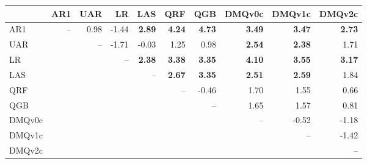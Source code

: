 \begin{tabular}{lrrrrrrrrr}
\toprule
 & AR1 & UAR & LR & LAS & QRF & QGB & DMQv0c & DMQv1c & DMQv2c \\
\midrule
AR1 & -- & 0.98 & -1.44 & \textbf{2.89} & \textbf{4.24} & \textbf{4.73} & \textbf{3.49} & \textbf{3.47} & \textbf{2.73} \\
UAR &  & -- & -1.71 & -0.03 & 1.25 & 0.98 & \textbf{2.54} & \textbf{2.38} & 1.71 \\
LR &  &  & -- & \textbf{2.38} & \textbf{3.38} & \textbf{3.35} & \textbf{4.10} & \textbf{3.55} & \textbf{3.17} \\
LAS &  &  &  & -- & \textbf{2.67} & \textbf{3.35} & \textbf{2.51} & \textbf{2.59} & 1.84 \\
QRF &  &  &  &  & -- & -0.46 & 1.70 & 1.55 & 0.66 \\
QGB &  &  &  &  &  & -- & 1.65 & 1.57 & 0.81 \\
DMQv0c &  &  &  &  &  &  & -- & -0.52 & -1.18 \\
DMQv1c &  &  &  &  &  &  &  & -- & -1.42 \\
DMQv2c &  &  &  &  &  &  &  &  & -- \\
\bottomrule
\end{tabular}
